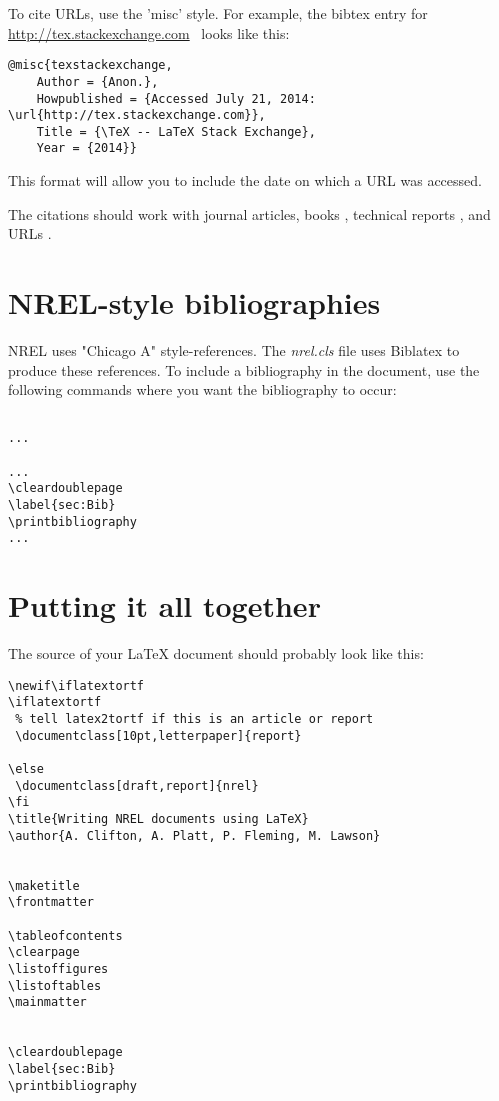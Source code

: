 To cite URLs, use the 'misc' style. For example, the bibtex entry for \href{http://tex.stackexchange.com}{http://tex.stackexchange.com}\ \cite{texstackexchange} looks like this:

\begin{verbatim}
@misc{texstackexchange,
	Author = {Anon.},
	Howpublished = {Accessed July 21, 2014: \url{http://tex.stackexchange.com}},
	Title = {\TeX -- LaTeX Stack Exchange},
	Year = {2014}}
\end{verbatim}

This format will allow you to include the date on which a URL was accessed.

The citations should work with journal articles, books \citep{Lamport_1986_a}, technical reports \citep{TechReportTest}, and URLs \citep{texstackexchange}.

\section{NREL-style bibliographies}
NREL uses "Chicago A" style-references. The \emph{nrel.cls} file uses Biblatex to produce these references. To include a bibliography in the document, use the following commands where you want the bibliography to occur:

\begin{verbatim}

...

...
\cleardoublepage
\label{sec:Bib}
\printbibliography
...

\end{verbatim}

\section{Putting it all together}
The source of your LaTeX document should probably look like this:

\begin{verbatim}
\newif\iflatextortf
\iflatextortf
 % tell latex2tortf if this is an article or report
 \documentclass[10pt,letterpaper]{report}
 
\else
 \documentclass[draft,report]{nrel} 
\fi
\title{Writing NREL documents using LaTeX}
\author{A. Clifton, A. Platt, P. Fleming, M. Lawson}


\maketitle
\frontmatter

\tableofcontents
\clearpage
\listoffigures
\listoftables
\mainmatter


\cleardoublepage
\label{sec:Bib}
\printbibliography


\end{verbatim}

